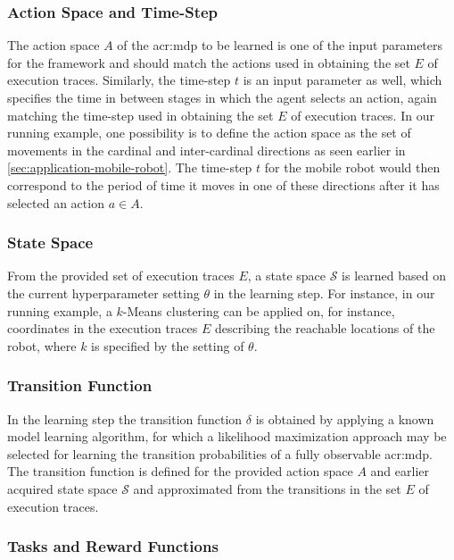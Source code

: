 \subsubsection{Action Space and Time-Step}
The action space $A$ of the \acrshort{acr:mdp} to be learned is one of the input parameters for the framework and should match the actions used in obtaining the set $E$ of execution traces.
Similarly, the time-step $t$ is an input parameter as well, which specifies the time in between stages in which the agent selects an action, again matching the time-step used in obtaining the set $E$ of execution traces.
In our running example, one possibility is to define the action space as the set of movements in the cardinal and inter-cardinal directions as seen earlier in \autoref{sec:application-mobile-robot}.
The time-step $t$ for the mobile robot would then correspond to the period of time it moves in one of these directions after it has selected an action $a \in A$.

\subsubsection{State Space}
From the provided set of execution traces $E$, a state space $\mathcal{S}$ is learned based on the current hyperparameter setting $\theta$ in the learning step.
For instance, in our running example, a $k$-Means clustering can be applied on, for instance, coordinates in the execution traces $E$ describing the reachable locations of the robot, where $k$ is specified by the setting of $\theta$.

\subsubsection{Transition Function}
In the learning step the transition function $\delta$ is obtained by applying a known model learning algorithm, for which a likelihood maximization approach may be selected for learning the transition probabilities of a fully observable \acrshort{acr:mdp}.
The transition function is defined for the provided action space $A$ and earlier acquired state space $\mathcal{S}$ and approximated from the transitions in the set $E$ of execution traces.

\subsubsection{Tasks and Reward Functions}


